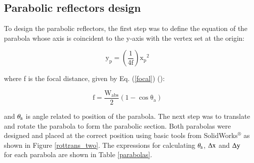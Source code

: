 
\subsection{Parabolic reflectors design}

To design the parabolic reflectors, the first step was to define the equation of the parabola whose axis is coincident to the y-axis with the vertex set at the origin:

\begin{equation}
\mathrm{{y_p} = \left( {\frac{1}{{4f}}} \right){x_p}^2}
\label{parabola}
\end{equation}

\noindent where f is the focal distance, given by Eq. (\ref{focal}) (\cite{Winston2005}):

\begin{equation}
\mathrm{f = \frac{{{W_{abs}}}}{2}\left( {1 - \cos {\theta_{a}}} \right)}
\label{focal}
\end{equation}

\noindent and $\rm{\theta_{a}}$ is angle related to position of the parabola. The next step was to translate and rotate the parabola to form the parabolic section. Both parabolas were designed and placed at the correct position using basic tools from SolidWorks$^{\circledR}$ as shown in Figure \ref{rottrans_two}. The expressions for calculating $\rm{\theta_{a}}$, $\rm{\Delta x}$ and $\rm{\Delta y}$ for each parabola are shown in Table \ref{parabolas}.

